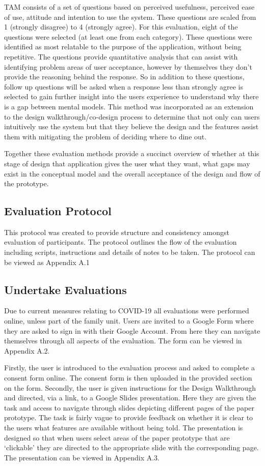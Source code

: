 \documentclass[a4 paper, 12pt]{article}
\begin{document}
TAM consists of a set of questions based on perceived usefulness, perceived ease of use, attitude and intention to use the system. These questions are scaled from 1 (strongly disagree) to 4 (strongly agree). For this evaluation, eight of the questions were selected (at least one from each category). These questions were identified as most relatable to the purpose of the application, without being repetitive. The questions provide quantitative analysis that can assist with identifying problem areas of user acceptance, however by themselves they don't provide the reasoning behind the response. So in addition to these questions, follow up questions will be asked when a response less than strongly agree is selected to gain further insight into the users experience to understand why there is a gap between mental models. This method was incorporated as an extension to the design walkthrough/co-design process to determine that not only can users intuitively use the system but that they believe the design and the features assist them with mitigating the problem of deciding where to dine out.

Together these evaluation methods provide a succinct overview of whether at this stage of design that application gives the user what they want, what gaps may exist in the conceptual model and the overall acceptance of the design and flow of the prototype.


\subsection{Evaluation Protocol}
This protocol was created to provide structure and consistency amongst evaluation of participants. The protocol outlines the flow of the evaluation including scripts, instructions and details of notes to be taken. The protocol can be viewed as Appendix A.1

\subsection{Undertake Evaluations}
Due to current measures relating to COVID-19 all evaluations were performed online, unless part of the family unit. Users are invited to a Google Form where they are asked to sign in with their Google Account. From here they can navigate themselves through all aspects of the evaluation. The form can be viewed in Appendix A.2.  

Firstly, the user is introduced to the evaluation process and asked to complete a consent form online. The consent form is then uploaded in the provided section on the form. Secondly, the user is given instructions for the Design Walkthrough and directed, via a link, to a Google Slides presentation. Here they are given the task and access to navigate through slides depicting different pages of the paper prototype. The task is fairly vague to provide feedback on whether it is clear to the users what features are available without being told. The presentation is designed so that when users select areas of the paper prototype that are ‘clickable’ they are directed to the appropriate slide with the corresponding page. The presentation can be viewed in Appendix A.3.
\end{document}
